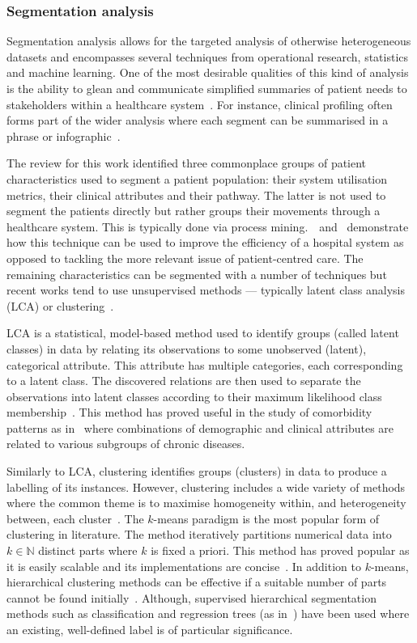 \documentclass[11pt]{article}
\begin{document}
\subsubsection{Segmentation analysis}

Segmentation analysis allows for the targeted analysis of otherwise
heterogeneous datasets and encompasses several techniques from operational
research, statistics and machine learning. One of the most desirable qualities
of this kind of analysis is the ability to glean and communicate simplified
summaries of patient needs to stakeholders within a healthcare
system~\cite{Vuik2016b, Yoon2020}. For instance, clinical profiling often
forms part of the wider analysis where each segment can be summarised in a
phrase or infographic~\cite{Vuik2016a, Yan2019}.

The review for this work identified three commonplace groups of patient
characteristics used to segment a patient population: their system
utilisation metrics, their clinical attributes and their pathway. The latter
is not used to segment the patients directly but rather groups their movements
through a healthcare system. This is typically done via process
mining.~\cite{Arnolds2018}~and~\cite{Delias2015} demonstrate how this technique
can be used to improve the efficiency of a hospital system as opposed to
tackling the more relevant issue of patient-centred care. The remaining
characteristics can be segmented with a number of techniques but recent works
tend to use unsupervised methods --- typically latent class analysis (LCA) or
clustering~\cite{Yan2018}.

LCA is a statistical, model-based method used to identify groups (called latent
classes) in data by relating its observations to some unobserved (latent),
categorical attribute. This attribute has multiple categories, each
corresponding to a latent class. The discovered relations are then used to
separate the observations into latent classes according to their maximum
likelihood class membership~\cite{Hagenaars2002,Lazarsfeld1968}. This method has
proved useful in the study of comorbidity patterns as
in~\cite{Kuwornu2014,Larsen2017} where combinations of demographic and clinical
attributes are related to various subgroups of chronic diseases.

Similarly to LCA, clustering identifies groups (clusters) in data to produce a
labelling of its instances. However, clustering includes a wide variety of
methods where the common theme is to maximise homogeneity within, and
heterogeneity between, each cluster~\cite{Everitt2011}. The \(k\)-means paradigm
is the most popular form of clustering in literature. The method iteratively
partitions numerical data into \(k \in \mathbb{N}\) distinct parts where \(k\)
is fixed a priori. This method has proved popular as it is easily scalable and
its implementations are concise~\cite{Olafsson2008,Wu2009}. In addition to
\(k\)-means, hierarchical clustering methods can be effective if a suitable
number of parts cannot be found initially~\cite{Vuik2016a}. Although, supervised
hierarchical segmentation methods such as classification and regression trees
(as in~\cite{Harper2006}) have been used where an existing, well-defined label
is of particular significance.
\end{document}
